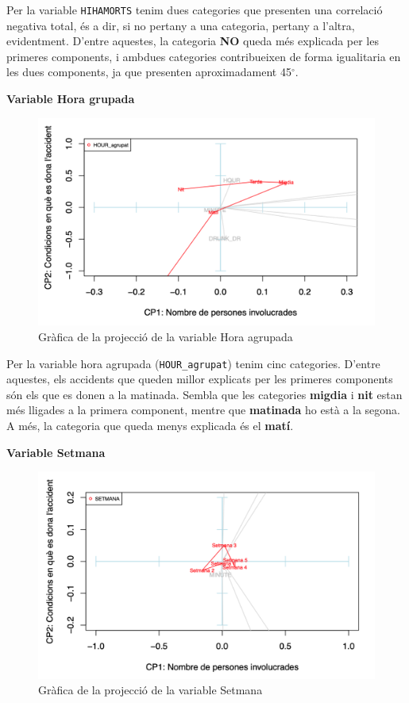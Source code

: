 \documentclass[11pt,longbibliography]{article}
\theoremstyle{definition}
\theoremstyle{remark}
\begin{document}
Per la variable \texttt{HIHAMORTS} tenim dues categories que presenten una correlació negativa total, és a dir, si no pertany a una categoria, pertany a l'altra, evidentment. D'entre aquestes, la categoria \textbf{NO} queda més explicada per les primeres components, i ambdues categories contribueixen de forma igualitaria en les dues components, ja que presenten aproximadament 45$^{\circ}$.


\textbf{Variable Hora grupada}

\begin{figure}[H]
\begin{center}
\includegraphics[width=12cm]{acp11}
\end{center}
\caption{Gràfica de la projecció de la variable Hora agrupada}
\label{fig:ACP11}
\end{figure}

Per la variable hora agrupada (\texttt{HOUR\_agrupat}) tenim cinc categories. D'entre aquestes, els accidents que queden millor explicats per les primeres components són els que es donen a la matinada. Sembla que les categories \textbf{migdia} i \textbf{nit} estan més lligades a la primera component, mentre que \textbf{matinada} ho està a la segona. A més, la categoria que queda menys explicada és el \textbf{matí}.



\textbf{Variable Setmana}

\begin{figure}[H]
\begin{center}
\includegraphics[width=12cm]{acp12}
\end{center}
\caption{Gràfica de la projecció de la variable Setmana}
\label{fig:ACP12}
\end{figure}
\end{document}
